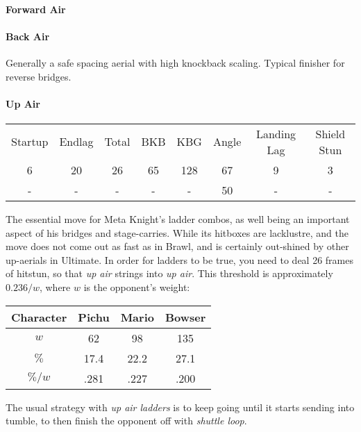 \paragraph{Forward Air}
\paragraph{Back Air}
Generally a safe spacing aerial with high knockback scaling. Typical finisher for reverse bridges.
\paragraph{Up Air}
\begin{center}
	\begin{tabular}{| c  c  c | c  c  c | c  c |}
		\hline
		Startup	& Endlag & Total & BKB & KBG & Angle &	Landing Lag	&	Shield Stun	\\
		6	&	20	&	26	&	65	&	128 & 	67\deg	&	9 	&	3	\\
		-	&	-	&	-	&	- 	& 	- 	&	50\deg	&	-	&	-	\\
		\hline
	\end{tabular}
\end{center}
The essential move for Meta Knight's ladder combos, as well  being an important aspect of his bridges and stage-carries. While its hitboxes are lacklustre, and the move does not come out as fast as in Brawl, and is certainly out-shined by other up-aerials in Ultimate. In order for ladders to be true, you need to deal 26 frames of hitstun, so that \textit{up air} strings into \emph{up air}. This threshold is approximately $0.236/w$, where $w$ is the opponent's weight:
\begin{center}
	\begin{tabular}{| c c c c |}
		\hline
		\textbf{Character} & Pichu & Mario & Bowser	\\
		\hline
		$w$		&	62		&	98		&	135		\\
		$\%$	&	17.4	&	22.2	&	27.1	\\
		$\%/w$	&	.281	&	.227	&	.200	\\
		\hline
	\end{tabular}
\end{center}
The usual strategy with \textit{up air ladders} is to keep going until it starts sending into tumble, to then finish the opponent off with \textit{shuttle loop}.

